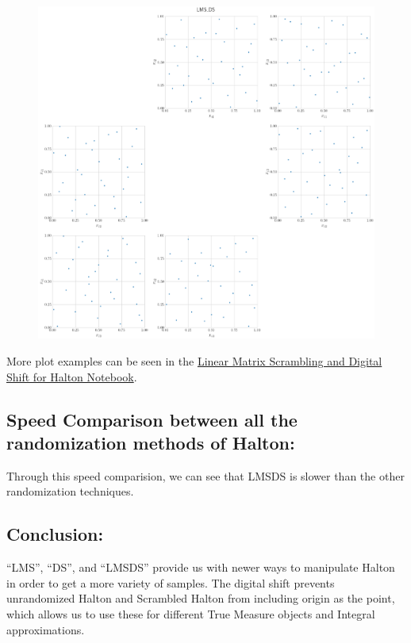     \begin{figure}[H]
    \centering
    \includegraphics[width = 0.99 \linewidth]{LMS_DS_Halton/lms_ds.png}
    \end{figure}
More plot examples can be seen in the \href{https://github.com/QMCSoftware/QMCSoftware/blob/develop/demos/linear-scrambled-halton.ipynb}{Linear Matrix Scrambling and Digital Shift for Halton Notebook}.
\subsection*{Speed Comparison between all the randomization methods of Halton:}

\noindent
    \begin{minipage}{.75\textwidth}
        
    \end{minipage}\hfill
\newline Through this speed comparision, we can see that LMS\textunderscore DS is slower than the other randomization techniques.
\subsection*{Conclusion:}
``LMS'', ``DS'', and ``LMS\textunderscore DS'' provide us with newer ways to manipulate Halton in order to get a more variety of samples. The digital shift prevents unrandomized Halton and Scrambled Halton from including origin as the point, which allows us to use these for different True Measure objects and Integral approximations.
